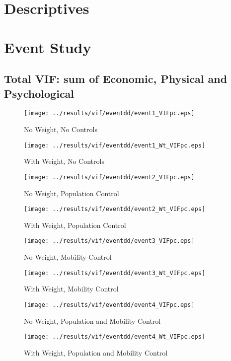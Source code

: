 \documentclass[11pt,letterpaper]{article}
\begin{document}
\section{Descriptives}

\section{Event Study}
	\subsection{Total VIF: sum of Economic, Physical and Psychological}
\begin{figure}[H]
\caption{No Weight, No Controls}
\centering
\texttt{[image: ../results/vif/eventdd/event1\_VIFpc.eps]}
\end{figure}

\begin{figure}[H]
\caption{With Weight, No Controls}
\centering
\texttt{[image: ../results/vif/eventdd/event1\_Wt\_VIFpc.eps]}
\end{figure}
\begin{figure}[H]
\caption{No Weight, Population Control}
\centering
\texttt{[image: ../results/vif/eventdd/event2\_VIFpc.eps]}
\end{figure}

\begin{figure}[H]
\caption{With Weight, Population Control}
\centering
\texttt{[image: ../results/vif/eventdd/event2\_Wt\_VIFpc.eps]}
\end{figure}
\begin{figure}[H]
\caption{No Weight, Mobility Control}
\centering
\texttt{[image: ../results/vif/eventdd/event3\_VIFpc.eps]}
\end{figure}

\begin{figure}[H]
\caption{With Weight, Mobility Control}
\centering
\texttt{[image: ../results/vif/eventdd/event3\_Wt\_VIFpc.eps]}
\end{figure}
\begin{figure}[H]
\caption{No Weight, Population and Mobility Control}
\centering
\texttt{[image: ../results/vif/eventdd/event4\_VIFpc.eps]}
\end{figure}

\begin{figure}[H]
\caption{With Weight, Population and Mobility Control}
\centering
\texttt{[image: ../results/vif/eventdd/event4\_Wt\_VIFpc.eps]}
\end{figure}
\end{document}
